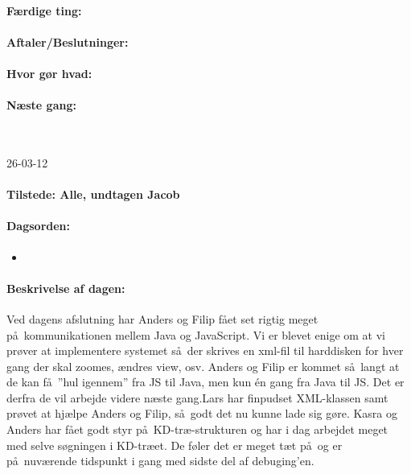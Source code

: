 \documentclass[a4paper,10pt,titlepage]{article}
\begin{document}
		\paragraph{F\ae rdige ting:}
		
		\paragraph{Aftaler/Beslutninger:}
		
		\paragraph{Hvor g\o r hvad:}
		
		\paragraph{N\ae ste gang:}\mbox{}\\
		
		\begin{center}
		26-03-12
		\end{center}
		
		\paragraph{Tilstede: Alle, undtagen Jacob}
		\paragraph{Dagsorden:}
		\begin{itemize}
					\item 
					
		\end{itemize}
		
		\paragraph{Beskrivelse af dagen:}
		Ved dagens afslutning har Anders og Filip f\aa et set rigtig meget p\aa \ kommunikationen mellem Java og JavaScript. Vi er blevet enige om at vi pr\o ver at implementere systemet s\aa \ der skrives en xml-fil til harddisken for hver gang der skal zoomes, \ae ndres view, osv. Anders og Filip er kommet s\aa \ langt at de kan f\aa \ ”hul igennem” fra JS til Java, men kun én gang fra Java til JS. Det er derfra de vil arbejde videre n\ae ste gang.Lars har finpudset XML-klassen samt pr\o vet at hj\ae lpe Anders og Filip, s\aa \ godt det nu kunne lade sig g\o re.
Kasra og Anders har f\aa et godt styr p\aa \ KD-tr\ae -strukturen og har i dag arbejdet meget med selve s\o gningen i KD-tr\ae et. De f\o ler det er meget t\ae t p\aa \ og er p\aa \ nuv\ae rende tidspunkt i gang med sidste del af debuging’en.
\end{document}
